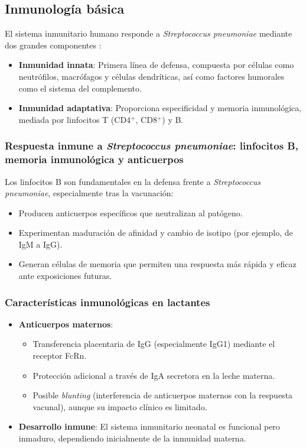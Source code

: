\subsection{Inmunología básica}

El sistema inmunitario humano responde a \textit{Streptococcus pneumoniae} mediante dos grandes componentes \cite{AEP2022}:

\begin{itemize}
    \item \textbf{Inmunidad innata}: Primera línea de defensa, compuesta por células como neutrófilos, macrófagos y células dendríticas, así como factores humorales como el sistema del complemento.
    \item \textbf{Inmunidad adaptativa}: Proporciona especificidad y memoria inmunológica, mediada por linfocitos T (CD4$^+$, CD8$^+$) y B.
\end{itemize}

\subsubsection{Respuesta inmune a \textit{Streptococcus pneumoniae}: linfocitos B, memoria inmunológica y anticuerpos}

Los linfocitos B son fundamentales en la defensa frente a \textit{Streptococcus pneumoniae}, especialmente tras la vacunación:
\begin{itemize}
    \item Producen anticuerpos específicos que neutralizan al patógeno.
    \item Experimentan maduración de afinidad y cambio de isotipo (por ejemplo, de IgM a IgG).
    \item Generan células de memoria que permiten una respuesta más rápida y eficaz ante exposiciones futuras.
\end{itemize}

\subsubsection{Características inmunológicas en lactantes}
\begin{itemize}
    \item \textbf{Anticuerpos maternos}: 
    \begin{itemize}
        \item Transferencia placentaria de IgG (especialmente IgG1) mediante el receptor FcRn.
        \item Protección adicional a través de IgA secretora en la leche materna.
        \item Posible \textit{blunting} (interferencia de anticuerpos maternos con la respuesta vacunal), aunque su impacto clínico es limitado.\cite{AEP2023Blunting}
    \end{itemize}
    \item \textbf{Desarrollo inmune}: El sistema inmunitario neonatal es funcional pero inmaduro, dependiendo inicialmente de la inmunidad materna.
\end{itemize}

